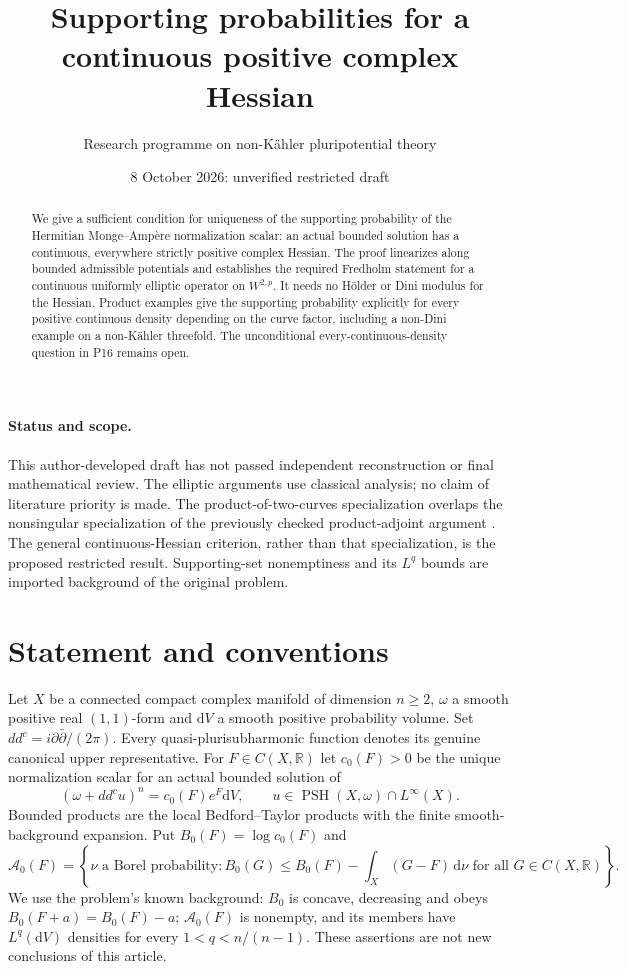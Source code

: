 \documentclass[11pt]{article}
\title{Supporting probabilities for a continuous positive complex Hessian}
\author{Research programme on non-K\"ahler pluripotential theory}
\date{8 October 2026: unverified restricted draft}
\newcommand{\ddc}{dd^c}
\newcommand{\PSH}{\operatorname{PSH}}
\newcommand{\cA}{\mathcal A}
\newcommand{\dV}{\mathrm dV}
\theoremstyle{remark}
\begin{document}
\maketitle
\begin{abstract}
We give a sufficient condition for uniqueness of the supporting probability
of the Hermitian Monge--Amp\`ere normalization scalar: an actual bounded
solution has a continuous, everywhere strictly positive complex Hessian.
The proof linearizes along bounded admissible potentials and establishes
the required Fredholm statement for a continuous uniformly elliptic
operator on $W^{2,p}$. It needs no H\"older or Dini modulus for the Hessian.
Product examples give the supporting probability explicitly for every
positive continuous density depending on the curve factor, including a
non-Dini example on a non-K\"ahler threefold. The unconditional
every-continuous-density question in P16 remains open.
\end{abstract}

\paragraph{Status and scope.}
This author-developed draft has not passed independent reconstruction or
final mathematical review. The elliptic arguments use classical analysis;
no claim of literature priority is made. The product-of-two-curves
specialization overlaps the nonsingular specialization of the previously
checked product-adjoint argument \cite{S07}. The general continuous-Hessian
criterion, rather than that specialization, is the proposed restricted
result. Supporting-set nonemptiness and its $L^q$ bounds are imported
background of the original problem.

\section{Statement and conventions}
Let $X$ be a connected compact complex manifold of dimension $n\geq2$,
$\omega$ a smooth positive real $(1,1)$-form and $\dV$ a smooth positive
probability volume. Set $\ddc=i\partial\bar\partial/(2\pi)$.
Every quasi-plurisubharmonic function denotes its genuine canonical upper
representative. For $F\in C(X,\mathbb R)$ let $c_0(F)>0$ be the unique
normalization scalar for an actual bounded solution of
\begin{equation}\label{eq:equation}
 (\omega+\ddc u)^n=c_0(F)e^F\dV,
 \qquad u\in\PSH(X,\omega)\cap L^\infty(X).
\end{equation}
Bounded products are the local Bedford--Taylor products with the finite
smooth-background expansion. Put $B_0(F)=\log c_0(F)$ and
\begin{equation}\label{eq:support}
 \cA_0(F)=\left\{\nu\text{ a Borel probability}:
 B_0(G)\leq B_0(F)-\int_X(G-F)\,\mathrm d\nu
 \text{ for all }G\in C(X,\mathbb R)\right\}.
\end{equation}
We use the problem's known background: $B_0$ is concave, decreasing and
obeys $B_0(F+a)=B_0(F)-a$; $\cA_0(F)$ is nonempty, and its members have
$L^q(\dV)$ densities for every $1<q<n/(n-1)$. These assertions are not
new conclusions of this article.
\end{document}
